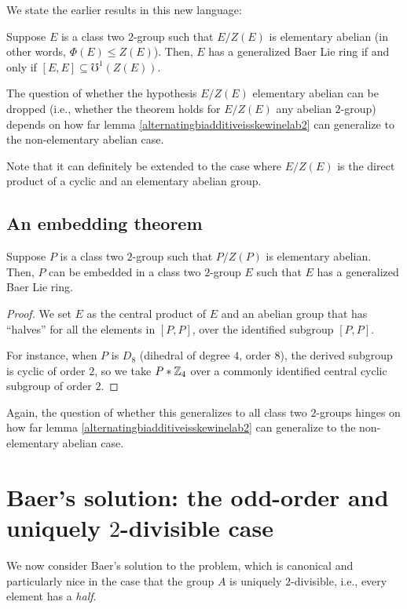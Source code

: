\documentclass[10pt]{amsart}
\begin{document}
We state the earlier results in this new language:

\begin{theorem}
  Suppose $E$ is a class two $2$-group such that $E/Z(E)$ is
  elementary abelian (in other words, $\Phi(E) \le Z(E)$). Then, $E$
  has a generalized Baer Lie ring if and only if $[E,E] \subseteq
  \mho^1(Z(E))$.
\end{theorem}

The question of whether the hypothesis $E/Z(E)$ elementary abelian can
be dropped (i.e., whether the theorem holds for $E/Z(E)$ any abelian
$2$-group) depends on how far lemma
\ref{alternatingbiadditiveisskewinelab2} can generalize to the
non-elementary abelian case.

Note that it can definitely be extended to the case where $E/Z(E)$ is
the direct product of a cyclic and an elementary abelian group.

\subsection{An embedding theorem}

\begin{theorem}\label{embedding}
  Suppose $P$ is a class two $2$-group such that $P/Z(P)$ is
  elementary abelian. Then, $P$ can be embedded in a class two
  $2$-group $E$ such that $E$ has a generalized Baer Lie ring.
\end{theorem}

\begin{proof}
  We set $E$ as the central product of $E$ and an abelian group that
  has ``halves'' for all the elements in $[P,P]$, over the identified
  subgroup $[P,P]$.

  For instance, when $P$ is $D_8$ (dihedral of degree $4$, order $8$),
  the derived subgroup is cyclic of order $2$, so we take $P * \mathbb{Z}_4$
  over a commonly identified central cyclic subgroup of order $2$.
\end{proof}

Again, the question of whether this generalizes to all class two
$2$-groups hinges on how far lemma
\ref{alternatingbiadditiveisskewinelab2} can generalize to the
non-elementary abelian case.

\section{Baer's solution: the odd-order and uniquely $2$-divisible case}

We now consider Baer's solution to the problem, which is canonical and
particularly nice in the case that the group $A$ is uniquely
$2$-divisible, i.e., every element has a {\em half}.
\end{document}
